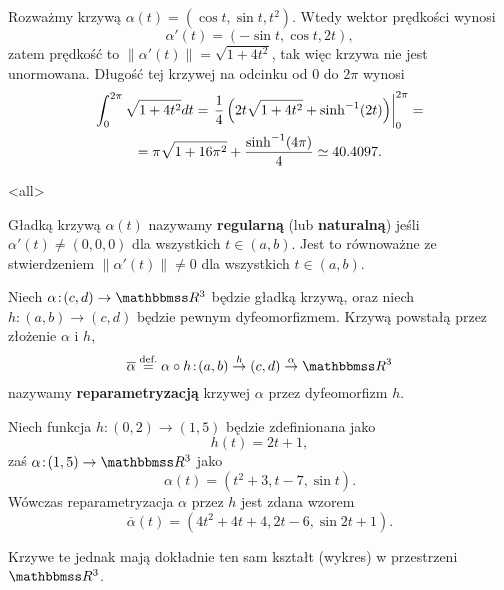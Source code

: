 \begin{frame}[<+->]

\begin{przyklad}
Rozważmy krzywą $\alpha(t)=(\cos{t},\sin{t},t^2)$. Wtedy wektor prędkości wynosi 
\[\alpha'(t)=(-\sin{t},\cos{t},2t),\]
zatem prędkość to 
$\|\alpha'(t)\|=\sqrt{1+4t^2}$, tak więc krzywa nie jest unormowana. Długość tej krzywej na odcinku od $0$ do $2\pi$ wynosi
\begin{multline*}
\int_{0}^{2\pi}\sqrt{1+4t^2} dt=\left.\frac{1}{4}\left( 2 t \sqrt{1+4 t^2}+\sinh^{-1}(2t)\right)\right|_{0}^{2\pi}=\\
=\pi \sqrt{1+16 \pi^2}+\frac{\sinh^{-1}(4 \pi)}{4}\simeq 40.4097.
\end{multline*}
\end{przyklad}

\end{frame}
\mode<all>{}
\begin{frame}[<+->]
\begin{definicja}
Gładką krzywą $\alpha(t)$ nazywamy \textbf{regularną} (lub \textbf{naturalną}) jeśli $\alpha'(t)\neq (0,0,0)$ dla wszystkich $t\in (a,b)$. Jest to równoważne ze stwierdzeniem $\|\alpha'(t)\|\neq 0$ dla wszystkich $t\in (a,b)$.
\end{definicja}

\begin{definicja}
Niech $\alpha\colon (c,d)\to \R^3$ będzie gładką krzywą, oraz niech $h\colon (a,b)\to (c,d)$ będzie pewnym dyfeomorfizmem. Krzywą powstałą przez złożenie $\alpha$ i $h$,\[\overline{\alpha}\define \alpha\circ h\colon (a,b)\top{h}(c,d)\top{\alpha}\R^3\]
nazywamy \textbf{reparametryzacją} krzywej $\alpha$ przez dyfeomorfizm $h$.


\end{definicja}
\end{frame}

\begin{frame}[<+->]


\begin{przyklad}
Niech funkcja $h\colon (0,2)\to (1,5)$ będzie zdefinionana jako \[h(t)=2t+1,\] zaś $\alpha\colon (1,5)\to\R^3$ jako \[\alpha(t)=(t^2+3,t-7,\sin{t}).\] Wówczas reparametryzacja $\alpha$ przez $h$ jest zdana wzorem
\[\overline{\alpha}(t)=(4t^2+4t+4,2t-6,\sin2t+1).\]

\pause Krzywe te jednak mają dokładnie ten sam kształt (wykres) w przestrzeni $\R^3$.
\end{przyklad}

\end{frame}

